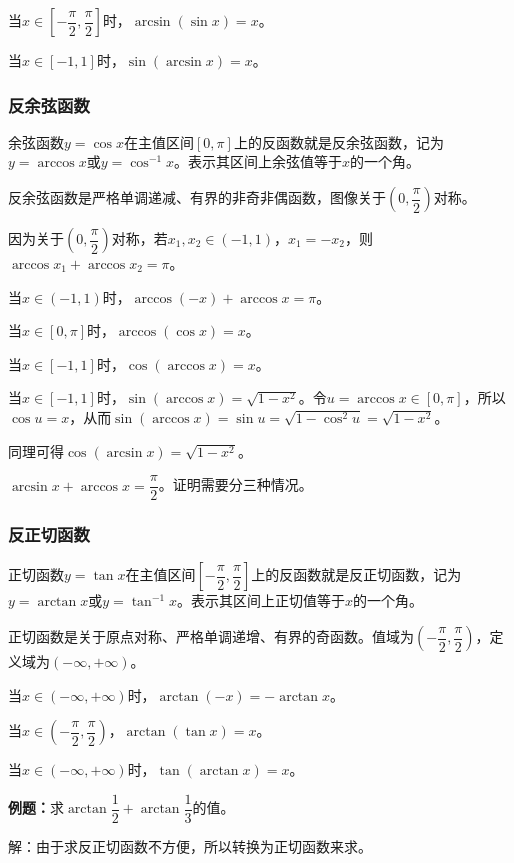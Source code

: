 \documentclass[UTF8, 12pt]{ctexart}
\begin{document}
当$x\in\left[-\dfrac{\pi}{2},\dfrac{\pi}{2}\right]$时，$\arcsin(\sin x)=x$。

当$x\in[-1,1]$时，$\sin(\arcsin x)=x$。

\subsubsection{反余弦函数}

余弦函数$y=\cos x$在主值区间$[0,\pi]$上的反函数就是反余弦函数，记为$y=\arccos x$或$y=\cos^{-1}x$。表示其区间上余弦值等于$x$的一个角。

反余弦函数是严格单调递减、有界的非奇非偶函数，图像关于$\left(0,\dfrac{\pi}{2}\right)$对称。

因为关于$\left(0,\dfrac{\pi}{2}\right)$对称，若$x_1,x_2\in(-1,1)$，$x_1=-x_2$，则$\arccos x_1+\arccos x_2=\pi$。

当$x\in(-1,1)$时，$\arccos(-x)+\arccos x=\pi$。

当$x\in[0,\pi]$时，$\arccos(\cos x)=x$。

当$x\in[-1,1]$时，$\cos(\arccos x)=x$。

当$x\in[-1,1]$时，$\sin(\arccos x)=\sqrt{1-x^2}$。令$u=\arccos x\in[0,\pi]$，所以$\cos u=x$，从而$\sin(\arccos x)=\sin u=\sqrt{1-\cos^2u}=\sqrt{1-x^2}$。

同理可得$\cos(\arcsin x)=\sqrt{1-x^2}$。

$\arcsin x+\arccos x=\dfrac{\pi}{2}$。证明需要分三种情况。

\subsubsection{反正切函数}

正切函数$y=\tan x$在主值区间$\left[-\dfrac{\pi}{2},\dfrac{\pi}{2}\right]$上的反函数就是反正切函数，记为$y=\arctan x$或$y=\tan^{-1}x$。表示其区间上正切值等于$x$的一个角。

正切函数是关于原点对称、严格单调递增、有界的奇函数。值域为$\left(-\dfrac{\pi}{2},\dfrac{\pi}{2}\right)$，定义域为$(-\infty,+\infty)$。

当$x\in(-\infty,+\infty)$时，$\arctan(-x)=-\arctan x$。

当$x\in\left(-\dfrac{\pi}{2},\dfrac{\pi}{2}\right)$，$\arctan(\tan x)=x$。

当$x\in(-\infty,+\infty)$时，$\tan(\arctan x)=x$。

\textbf{例题：}求$\arctan\dfrac{1}{2}+\arctan\dfrac{1}{3}$的值。

解：由于求反正切函数不方便，所以转换为正切函数来求。
\end{document}
